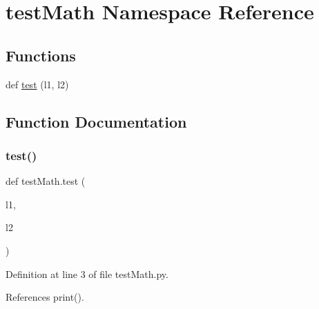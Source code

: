 \hypertarget{namespacetest_math}{}\section{test\+Math Namespace Reference}
\label{namespacetest_math}
\subsection*{Functions}
\begin{DoxyCompactItemize}
\item 
def \hyperlink{namespacetest_math_accae4d78fc0739220d35c06c2c0d5822}{test} (l1, l2)
\end{DoxyCompactItemize}


\subsection{Function Documentation}
\mbox{\label{namespacetest_math_accae4d78fc0739220d35c06c2c0d5822}} 
\subsubsection{\texorpdfstring{test()}{test()}}
{\footnotesize\ttfamily def test\+Math.\+test (\begin{DoxyParamCaption}\item[{}]{l1,  }\item[{}]{l2 }\end{DoxyParamCaption})}



Definition at line 3 of file test\+Math.\+py.



References print().


